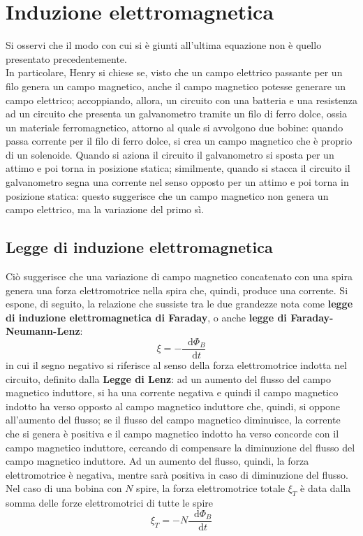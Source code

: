 \documentclass[a4paper]{extarticle}
\newcommand\dif{\mathop{}\!\mathrm{d}}
\begin{document}
\section{Induzione elettromagnetica}
Si osservi che il modo con cui si è giunti all'ultima equazione non è quello presentato precedentemente.\\
In particolare, Henry si chiese se, visto che un campo elettrico passante per un filo genera un campo magnetico, anche il campo magnetico potesse generare un campo elettrico; accoppiando, allora, un circuito con una batteria e una resistenza ad un circuito che presenta un galvanometro tramite un filo di ferro dolce, ossia un materiale ferromagnetico, attorno al quale si avvolgono due bobine: quando passa corrente per il filo di ferro dolce, si crea un campo magnetico che è proprio di un solenoide. Quando si aziona il circuito il galvanometro si sposta per un attimo e poi torna in posizione statica; similmente, quando si stacca il circuito il galvanometro segna una corrente nel senso opposto per un attimo e poi torna in posizione statica: questo suggerisce che un campo magnetico non genera un campo elettrico, ma la variazione del primo sì.\\

\vspace{1em}
\subsection{Legge di induzione elettromagnetica}
Ciò suggerisce che una variazione di campo magnetico concatenato con una spira genera una forza elettromotrice nella spira che, quindi, produce una corrente. Si espone, di seguito, la relazione che sussiste tra le due grandezze nota come \textbf{legge di induzione elettromagnetica di Faraday}, o anche \textbf{legge di Faraday-Neumann-Lenz}:
\[\boxed{\xi = - \dfrac{\dif \Phi_B}{\dif t}}\]
in cui il segno negativo si riferisce al senso della forza elettromotrice indotta nel circuito, definito dalla \textbf{Legge di Lenz}: ad un aumento del flusso del campo magnetico induttore, si ha una corrente negativa e quindi il campo magnetico indotto ha verso opposto al campo magnetico induttore che, quindi, si oppone all'aumento del flusso; se il flusso del campo magnetico diminuisce, la corrente che si genera è positiva e il campo magnetico indotto ha verso concorde con il campo magnetico induttore, cercando di compensare la diminuzione del flusso del campo magnetico induttore. Ad un aumento del flusso, quindi, la forza elettromotrice è negativa, mentre sarà positiva in caso di diminuzione del flusso.\\
Nel caso di una bobina con $N$ spire, la forza elettromotrice totale $\xi_T$ è data dalla somma delle forze elettromotrici di tutte le spire
\[\boxed{\xi_T = - N \dfrac{\dif \Phi_B}{\dif t}}\]
\end{document}
